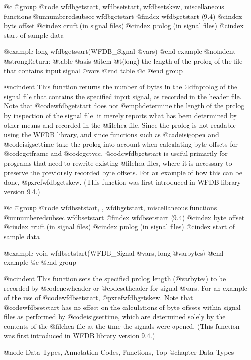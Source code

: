 {{{{{{{{{{@c @group
@node     wfdbgetstart, wfdbsetstart, wfdbsetskew, miscellaneous functions
@unnumberedsubsec wfdbgetstart
@findex wfdbgetstart (9.4)
@cindex byte offset
@cindex cruft (in signal files)
@cindex prolog (in signal files)
@cindex start of sample data

@example
long wfdbgetstart(WFDB_Signal @var{s})
@end example
@noindent
@strong{Return:}
@table @asis
@item @t{(long)}
the length of the prolog of the file that contains input signal @var{s}
@end table
@c @end group

@noindent
This function returns the number of bytes in the @dfn{prolog} of the
signal file that contains the specified input signal, as recorded in the
header file.  Note that @code{wfdbgetstart} does not
@emph{determine} the length of the prolog by inspection of the signal
file; it merely reports what has been determined by other means and
recorded in the @file{hea} file.  Since the prolog is not readable
using the WFDB library, and since functions such as @code{isigopen} and
@code{isigsettime} take the prolog into account when calculating byte
offsets for @code{getframe} and @code{getvec}, @code{wfdbgetstart} is
useful primarily for programs that need to rewrite existing
@file{hea} files, where it is necessary to preserve the previously
recorded byte offsets.  For an example of how this can be done,
@pxref{wfdbgetskew}.  (This function was first introduced in WFDB library
version 9.4.)

@c @group
@node     wfdbsetstart, , wfdbgetstart, miscellaneous functions
@unnumberedsubsec wfdbsetstart
@findex wfdbsetstart (9.4)
@cindex byte offset
@cindex cruft (in signal files)
@cindex prolog (in signal files)
@cindex start of sample data

@example
void wfdbsetstart(WFDB_Signal @var{s}, long @var{bytes})
@end example
@c @end group

@noindent
This function sets the specified prolog length (@var{bytes}) to be
recorded by @code{newheader} or @code{setheader} for signal @var{s}.
For an example of the use of @code{wfdbsetstart}, @pxref{wfdbgetskew}.  Note
that @code{wfdbsetstart} has no effect on the calculations of byte offsets
within signal files as performed by @code{isigsettime}, which are
determined solely by the contents of the @file{hea} file at the time
the signals were opened.  (This function was first introduced in WFDB library
version 9.4.)


@node     Data Types, Annotation Codes, Functions, Top
@chapter Data Types

}}}}}}}}}}
